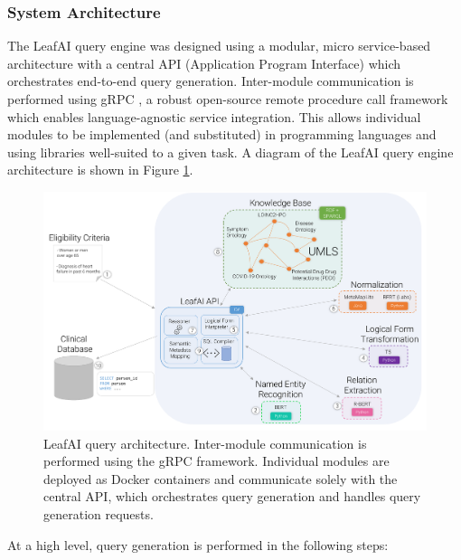 \documentclass[../main.tex]{subfiles}
\begin{document}
\subsubsection{System Architecture}

The LeafAI query engine was designed using a modular, micro service-based architecture with a central API (Application Program Interface) which orchestrates end-to-end query generation. Inter-module communication is performed using gRPC \cite{grpc}, a robust open-source remote procedure call framework which enables language-agnostic service integration. This allows individual modules to be implemented (and substituted) in programming languages and using libraries well-suited to a given task. A diagram of the LeafAI query engine architecture is shown in Figure \ref{aim2_fig_leafai_architecture}. 

\begin{figure}[h]
  \includegraphics[scale=0.65]{Figures/Aim2/aim2_leafai_architecture.pdf}  
\caption{LeafAI query architecture. Inter-module communication is performed using the gRPC framework. Individual modules are deployed as Docker \cite{docker} containers and communicate solely with the central API, which orchestrates query generation and handles query generation requests.}
\label{aim2_fig_leafai_architecture}
\end{figure}

At a high level, query generation is performed in the following steps:
\end{document}
